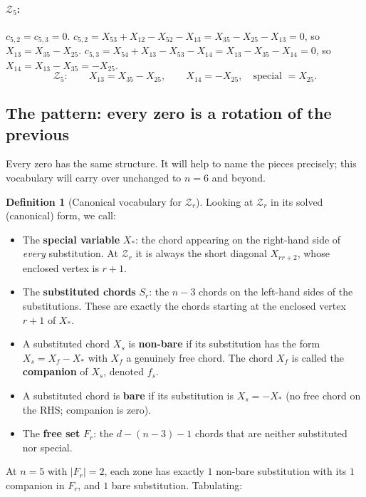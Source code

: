 \documentclass[11pt]{article}
\newcommand{\X}[2]{X_{#1#2}}
\newcommand{\Z}{\mathcal{Z}}
\theoremstyle{definition}
\newtheorem{definition}{Definition}
\begin{document}
\paragraph{$\Z_5$:} $c_{5,2}=c_{5,3}=0$.
$c_{5,2}=\X{5}{3}+\X{1}{2}-\X{5}{2}-\X{1}{3}=\X{3}{5}-\X{2}{5}-\X{1}{3}=0$, so $\X{1}{3}=\X{3}{5}-\X{2}{5}$.
$c_{5,3}=\X{5}{4}+\X{1}{3}-\X{5}{3}-\X{1}{4}=\X{1}{3}-\X{3}{5}-\X{1}{4}=0$, so $\X{1}{4}=\X{1}{3}-\X{3}{5}=-\X{2}{5}$.
\begin{equation}
\Z_5:\qquad\boxed{\X{1}{3}=\X{3}{5}-\X{2}{5},\qquad \X{1}{4}=-\X{2}{5}}, \quad\text{special }=\X{2}{5}.
\end{equation}

\subsection{The pattern: every zero is a rotation of the previous}
\label{sec:n5-pattern}

Every zero has the same structure. It will help to name the pieces precisely;
this vocabulary will carry over unchanged to $n=6$ and beyond.

\begin{definition}[Canonical vocabulary for $\Z_r$]
\label{def:vocabulary}
Looking at $\Z_r$ in its solved (canonical) form, we call:
\begin{itemize}[nosep,leftmargin=2em]
\item The \textbf{special variable} $X_*$: the chord appearing on the
right-hand side of \emph{every} substitution. At $\Z_r$ it is always the
short diagonal $\X{r}{r+2}$, whose enclosed vertex is $r+1$.
\item The \textbf{substituted chords} $S_r$: the $n-3$ chords on the
left-hand sides of the substitutions. These are exactly the chords starting
at the enclosed vertex $r+1$ of $X_*$.
\item A substituted chord $X_s$ is \textbf{non-bare} if its substitution
has the form $X_s = X_f - X_*$ with $X_f$ a genuinely free chord.
The chord $X_f$ is called the \textbf{companion} of $X_s$, denoted $f_s$.
\item A substituted chord is \textbf{bare} if its substitution is $X_s=-X_*$
(no free chord on the RHS; companion is zero).
\item The \textbf{free set} $F_r$: the $d-(n-3)-1$ chords that are neither
substituted nor special.
\end{itemize}
\end{definition}

At $n=5$ with $|F_r|=2$, each zone has exactly $1$ non-bare substitution
with its $1$ companion in $F_r$, and $1$ bare substitution. Tabulating:
\end{document}
